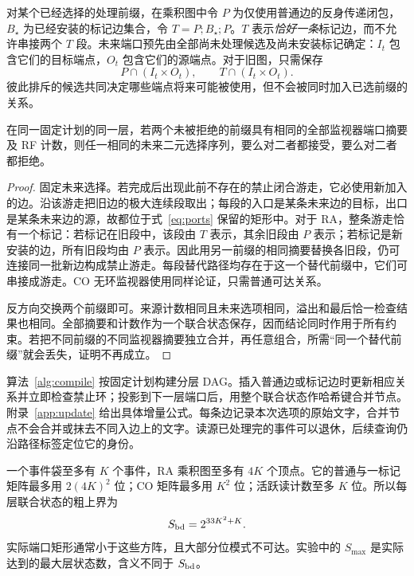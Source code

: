 对某个已经选择的处理前缀，在乘积图中令 $P$ 为仅使用普通边的反身传递闭包，$B_\star$ 为已经安装的标记边集合，令 $T=P;B_\star;P$。$T$ 表示\emph{恰好一条}标记边，而不允许串接两个 $T$ 段。未来端口预先由全部尚未处理候选及尚未安装标记确定：$I_t$ 包含它们的目标端点，$O_t$ 包含它们的源端点。对于旧图，只需保存
\begin{equation}\label{eq:ports}
 P\cap(I_t\times O_t),\qquad T\cap(I_t\times O_t).
\end{equation}
彼此排斥的候选共同决定哪些端点将来可能被使用，但不会被同时加入已选前缀的关系。

\begin{lemma}[相同联合摘要具有相同后缀]\label{lem:ports}
在同一固定计划的同一层，若两个未被拒绝的前缀具有相同的全部监视器端口摘要及 RF 计数，则任一相同的未来二元选择序列，要么对二者都接受，要么对二者都拒绝。
\end{lemma}
\begin{proof}
固定未来选择。若完成后出现此前不存在的禁止闭合游走，它必使用新加入的边。沿该游走把旧边的极大连续段取出；每段的入口是某条未来边的目标，出口是某条未来边的源，故都位于式~\eqref{eq:ports} 保留的矩形中。对于 RA，整条游走恰有一个标记：若标记在旧段中，该段由 $T$ 表示，其余旧段由 $P$ 表示；若标记是新安装的边，所有旧段均由 $P$ 表示。因此用另一前缀的相同摘要替换各旧段，仍可连接同一批新边构成禁止游走。每段替代路径均存在于这一个替代前缀中，它们可串接成游走。CO 无环监视器使用同样论证，只需普通可达关系。

反方向交换两个前缀即可。来源计数相同且未来选项相同，溢出和最后恰一检查结果也相同。全部摘要和计数作为一个联合状态保存，因而结论同时作用于所有约束。若把不同前缀的不同监视器摘要独立合并，再任意组合，所需“同一个替代前缀”就会丢失，证明不再成立。\qedhere
\end{proof}

算法~\ref{alg:compile} 按固定计划构建分层 DAG。插入普通边或标记边时更新相应关系并立即检查禁止环；投影到下一层端口后，用整个联合状态作哈希键合并节点。附录~\ref{app:update} 给出具体增量公式。每条边记录本次选项的原始文字，合并节点不会合并或抹去不同入边上的文字。读源已处理完的事件可以退休，后续查询仍沿路径标签定位它的身份。



一个事件袋至多有 $K$ 个事件，RA 乘积图至多有 $4K$ 个顶点。它的普通与一标记矩阵最多用 $2(4K)^2$ 位；CO 矩阵最多用 $K^2$ 位；活跃读计数至多 $K$ 位。所以每层联合状态的粗上界为
\begin{equation}\label{eq:statebound}
 S_{\rm bd}=2^{33K^2+K}.
\end{equation}
实际端口矩形通常小于这些方阵，且大部分位模式不可达。实验中的 $S_{\max}$ 是实际达到的最大层状态数，含义不同于 $S_{\rm bd}$。

